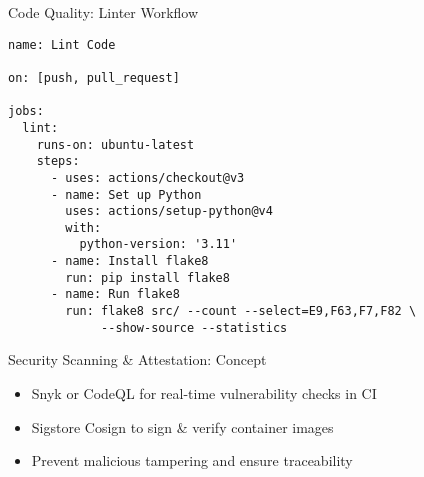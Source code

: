 \documentclass[aspectratio=169]{beamer}
\begin{document}
\begin{frame}[fragile]{Code Quality: Linter Workflow}

\begin{verbatim}
name: Lint Code

on: [push, pull_request]

jobs:
  lint:
    runs-on: ubuntu-latest
    steps:
      - uses: actions/checkout@v3
      - name: Set up Python
        uses: actions/setup-python@v4
        with:
          python-version: '3.11'
      - name: Install flake8
        run: pip install flake8
      - name: Run flake8
        run: flake8 src/ --count --select=E9,F63,F7,F82 \
             --show-source --statistics
\end{verbatim}
\end{frame}


\begin{frame}{Security Scanning \& Attestation: Concept}


\begin{itemize}
\item Snyk or CodeQL for real-time vulnerability checks in CI
\item Sigstore Cosign to sign \& verify container images
\item Prevent malicious tampering and ensure traceability
\end{itemize}
\end{frame}
\end{document}
